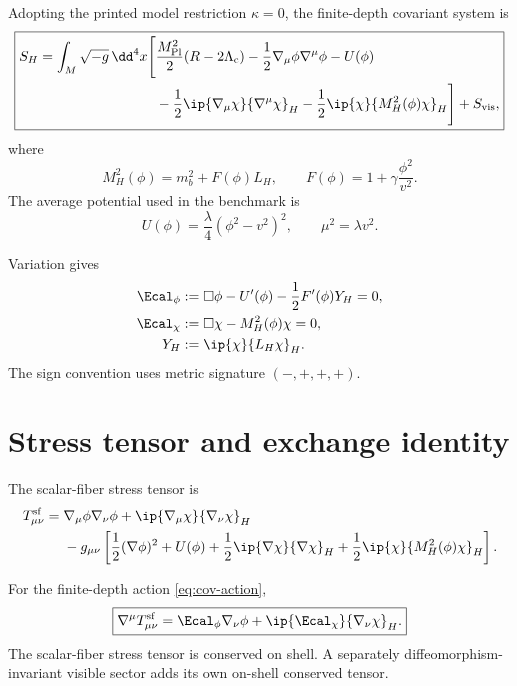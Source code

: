 Adopting the printed model restriction $\kappa=0$, the finite-depth covariant system is
\begin{equation}
\boxed{
\begin{aligned}
S_H=\int_M\sqrt{-g}\,\dd^4x\Bigg[
&\frac{M_{\mathrm{Pl}}^2}{2}(R-2\Lambda_{\mathrm c})
-\frac12\nabla_\mu\phi\nabla^\mu\phi-U(\phi)\\
&-\frac12\ip{\nabla_\mu\chi}{\nabla^\mu\chi}_H
-\frac12\ip{\chi}{M_H^2(\phi)\chi}_H
\Bigg]+S_{\mathrm{vis}},
\end{aligned}}
\label{eq:cov-action}
\end{equation}
where
\begin{equation}
M_H^2(\phi)=m_b^2+F(\phi)L_H,
\qquad
F(\phi)=1+\gamma\frac{\phi^2}{v^2}.
\label{eq:cov-mass-op}
\end{equation}
The average potential used in the benchmark is
\begin{equation}
U(\phi)=\frac\lambda4(\phi^2-v^2)^2,
\qquad
\mu^2=\lambda v^2.
\label{eq:cov-average-potential}
\end{equation}

Variation gives
\begin{align}
\Ecal_\phi
&:=\Box\phi-U'(\phi)-\frac12F'(\phi)Y_H=0,
\label{eq:cov-phi-eom}\\
\Ecal_\chi
&:=\Box\chi-M_H^2(\phi)\chi=0,
\label{eq:cov-chi-eom}\\
Y_H
&:=\ip{\chi}{L_H\chi}_H.
\label{eq:cov-YH}
\end{align}
The sign convention uses metric signature $(-,+,+,+)$.

\section{Stress tensor and exchange identity}

The scalar-fiber stress tensor is
\begin{equation}
\begin{aligned}
T^{\mathrm{sf}}_{\mu\nu}={}&
\nabla_\mu\phi\nabla_\nu\phi
+\ip{\nabla_\mu\chi}{\nabla_\nu\chi}_H\\
&-g_{\mu\nu}\left[
\frac12(\nabla\phi)^2+U(\phi)
+\frac12\ip{\nabla\chi}{\nabla\chi}_H
+\frac12\ip{\chi}{M_H^2(\phi)\chi}_H
\right].
\end{aligned}
\end{equation}

\begin{theorem}
For the finite-depth action \eqref{eq:cov-action},
\begin{equation}
\boxed{
\nabla^\mu T^{\mathrm{sf}}_{\mu\nu}
=\Ecal_\phi\nabla_\nu\phi
+\ip{\Ecal_\chi}{\nabla_\nu\chi}_H.}
\label{eq:cov-ward}
\end{equation}
The scalar-fiber stress tensor is conserved on shell.  A separately diffeomorphism-invariant visible sector adds its own on-shell conserved tensor.
\end{theorem}

